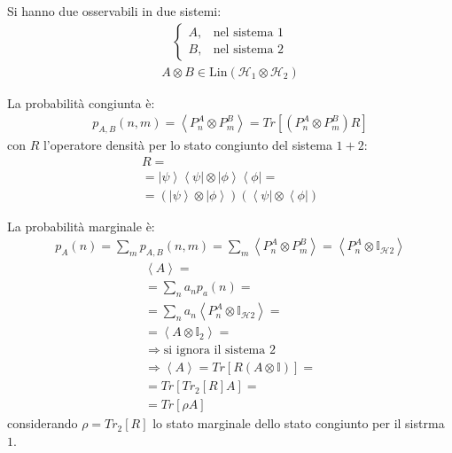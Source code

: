 Si hanno due osservabili in due sistemi:
\begin{equation}\begin{split}
\begin{cases}
A, & \textrm{nel sistema 1}\\
B, & \textrm{nel sistema 2}
\end{cases}
\end{split}\end{equation}
\begin{equation}\begin{split}
A\otimes B\in \textrm{Lin}\left(\mathcal{H}_1\otimes \mathcal{H}_2\right)
\end{split}\end{equation}

La probabilità congiunta è:
\begin{equation}\begin{split}
p_{A,B}\left(n,m\right)=\left\langle P_n^A\otimes P_m^B \right\rangle=Tr\left[\left(P_n^A\otimes P_m^B\right)R\right]
\end{split}\end{equation}
con $R$ l'operatore densità per lo stato congiunto del sistema $1+2$:
\begin{equation}\begin{split}
R=\\
=\left |\psi  \right\rangle\left\langle \psi \right |\otimes \left |\phi \right\rangle\left\langle \phi\right |=\\
=\left(\left |\psi  \right\rangle\otimes \left |\phi \right\rangle\right)\left(\left\langle \psi \right |\otimes \left\langle \phi\right |\right)
\end{split}\end{equation}

La probabilità marginale è:
\begin{equation}\begin{split}
p_A\left(n\right)=\sum_m{p_{A,B}\left(n,m\right)}=\sum_m{\left\langle P_n^A\otimes P_m^B \right\rangle}=\left\langle P_n^A\otimes \mathbb{I}_{\mathcal{H}2} \right\rangle
\end{split}\end{equation}
\begin{equation}\begin{split}
\left\langle A \right\rangle=\\
=\sum_n{a_np_a\left(n\right)}=\\
=\sum_n{a_n\left\langle P_n^A\otimes \mathbb{I}_{\mathcal{H}2} \right\rangle}=\\
=\left\langle A\otimes \mathbb{I}_2 \right\rangle =\\
\Longrightarrow \textrm{si ignora il sistema }2\\
\Longrightarrow \left\langle A \right\rangle=Tr\left[R\left(A\otimes \mathbb{I}\right)\right]=\\
=Tr\left[Tr_2\left[R\right]A\right]=\\
=Tr\left[\rho A\right]
\end{split}\end{equation}
considerando $\rho=Tr_2\left[R\right]$ lo stato marginale dello stato congiunto per il sistrma $1$.

